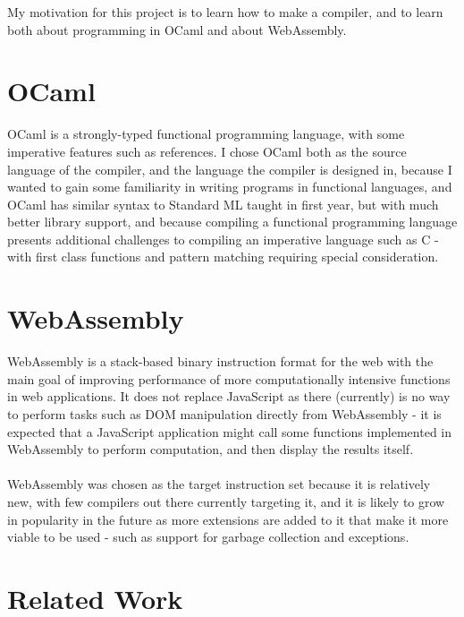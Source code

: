 \documentclass[12pt,twoside,notitlepage]{report}
\begin{document}


My motivation for this project is to learn how to make a compiler, and to learn both about programming in OCaml and about WebAssembly.


\section{OCaml}
OCaml\cite{OCaml} is a strongly-typed functional programming language, with some imperative features such as references. I chose OCaml both as the source language of the compiler, and the language the compiler is designed in, because I wanted to gain some familiarity in writing programs in functional languages, and OCaml has similar syntax to Standard ML taught in first year, but with much better library support, and because compiling a functional programming language presents additional challenges to compiling an imperative language such as C - with first class functions and pattern matching requiring special consideration.

\section{WebAssembly}
WebAssembly\cite{webassembly} is a stack-based binary instruction format for the web with the main goal of improving performance  of  more  computationally  intensive  functions  in  web  applications.   It  does not  replace  JavaScript  as  there  (currently)  is  no  way  to  perform  tasks  such  as  DOM manipulation  directly  from  WebAssembly  -  it  is  expected  that  a  JavaScript  application might  call  some  functions  implemented  in  WebAssembly  to  perform  computation,  and then display the results itself.
\\\\
WebAssembly was chosen as the target instruction set because it is relatively new, with few compilers out there currently targeting it, and it is likely to grow in popularity in the future as more extensions are added to it that make it more viable to be used - such as support for garbage collection and exceptions.




\section{Related Work}
\end{document}
